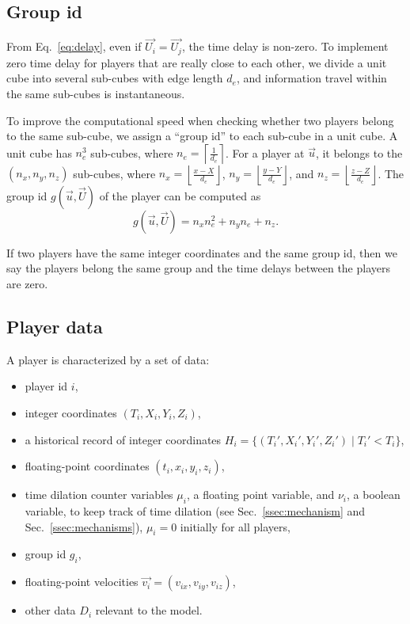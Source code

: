 \documentclass{svproc}
\begin{document}
\subsection{Group id}

From Eq.~\ref{eq:delay}, even if $\overrightarrow{U_i} = \overrightarrow{U_j}$, the time delay is non-zero.
To implement zero time delay for players that are really close to each other, 
we divide a unit cube into several sub-cubes with edge length $d_e$, 
and information travel within the same sub-cubes is instantaneous.

To improve the computational speed when checking whether two players belong to the same sub-cube,
we assign a ``group id'' to each sub-cube in a unit cube.
A unit cube has $n_e^3$ sub-cubes, where $n_e = \left \lceil \frac{1}{d_e} \right \rceil$.
For a player at $\overrightarrow{u}$, it belongs to the $(n_x, n_y, n_z)$ sub-cubes,
where $n_x = \left \lfloor \frac{x - X} {d_e} \right \rfloor$,
$n_y = \left \lfloor \frac{y - Y} {d_e} \right \rfloor$,
and $n_z = \left \lfloor \frac{z - Z} {d_e} \right \rfloor$.
The group id $g(\overrightarrow{u}, \overrightarrow{U})$ of the player
can be computed as
\begin{equation} \label{eq:group}
    g(\overrightarrow{u}, \overrightarrow{U}) = n_x n_e^2 + n_y n_e + n_z.
\end{equation}

If two players have the same integer coordinates and the same group id,
then we say the players belong the same group and the time delays between the players are zero.

\subsection{Player data}

A player is characterized by a set of data:
\begin{itemize}
  \item player id $i$,
  \item integer coordinates $(T_i, X_i, Y_i, Z_i)$,
  \item a historical record of integer coordinates $H_i = \{(T_i', X_i', Y_i', Z_i') \mid T_i' < T_i \}$,
  \item floating-point coordinates $(t_i, x_i, y_i, z_i)$,
  \item time dilation counter variables $\mu_i$, a floating point variable,
        and $\nu_i$, a boolean variable,
        to keep track of time dilation (see Sec.~\ref{ssec:mechanism} and Sec.~\ref{ssec:mechanisms}),
        $\mu_i = 0$ initially for all players,
  \item group id $g_i$,
  \item floating-point velocities $\overrightarrow{v_i} = (v_{ix}, v_{iy}, v_{iz})$,
  \item other data $D_i$ relevant to the model.
\end{itemize}
\end{document}
